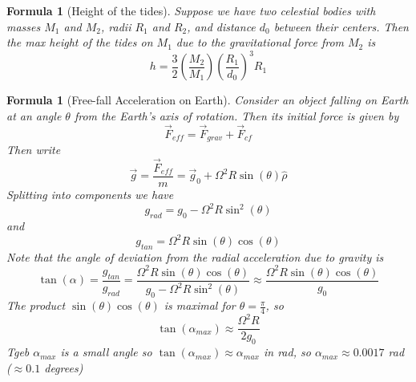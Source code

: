 \documentclass[12pt]{article}
\newtheorem{for}[thm]{Formula}
\theoremstyle{definition}
\theoremstyle{remark}
\numberwithin{equation}{section}
\begin{document}
\vspace{15pt}

\begin{for}[Height of the tides]
        Suppose we have two celestial bodies with masses $M_1$ and $M_2$, radii $R_1$ and $R_2$, and distance $d_0$ between their centers. Then the max height of the tides on $M_1$ due to the gravitational force from $M_2$ is \begin{equation}
                h = \frac{3}{2}\left(\frac{M_2}{M_1}\right)\left(\frac{R_1}{d_0}\right)^3R_1
        \end{equation}
\end{for}


\vspace{15pt}

\begin{for}[Free-fall Acceleration on Earth]
        Consider an object falling on Earth at an angle $\theta$ from the Earth's axis of rotation. Then its initial force is given by \begin{equation}
                \vec{F}_{eff} = \vec{F}_{grav} + \vec{F}_{cf}
        \end{equation}
        Then write \begin{equation}
                \vec{g} = \frac{\vec{F}_{eff}}{m} = \vec{g}_0 + \Omega^2R\sin(\theta)\hat{\rho}
        \end{equation}
        Splitting into components we have \begin{equation}
                g_{rad} = g_0 - \Omega^2R\sin^2(\theta)
        \end{equation}
        and \begin{equation}
                g_{tan} = \Omega^2R\sin(\theta)\cos(\theta)
        \end{equation}
        Note that the angle of deviation from the radial acceleration due to gravity is \begin{equation}
                \tan(\alpha) = \frac{g_{tan}}{g_{rad}} = \frac{\Omega^2R\sin(\theta)\cos(\theta)}{g_0 - \Omega^2R\sin^2(\theta)} \approx \frac{\Omega^2R\sin(\theta)\cos(\theta)}{g_0}
        \end{equation}
        The product $\sin(\theta)\cos(\theta)$ is maximal for $\theta = \frac{\pi}{4}$, so \begin{equation}
                \tan(\alpha_{max}) \approx \frac{\Omega^2R}{2g_0}
        \end{equation}
        Tgeb $\alpha_{max}$ is a small angle so $\tan(\alpha_{max}) \approx \alpha_{max}$ in rad, so $\alpha_{max} \approx 0.0017$ rad ($\approx 0.1$ degrees)
\end{for}
\end{document}
